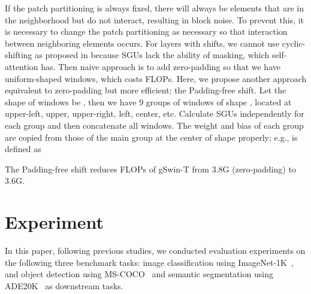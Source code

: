 \documentclass{article}
\begin{document}
If the patch partitioning is always fixed, there will always be elements that are in the neighborhood but do not interact, resulting in block noise. To prevent this, it is necessary to change the patch partitioning as necessary so that interaction between neighboring elements occurs.
For layers with shifts, we cannot use cyclic-shifting as proposed in \citep{liu2021swin} because SGUs lack the ability of masking, which self-attention has. Then naive approach is to add zero-padding so that we have uniform-shaped windows, which costs FLOPs. Here, we propose another approach equivalent to zero-padding but more efficient; the Padding-free shift.
Let the shape of windows be , then we have 9 groups of windows of shape , located at upper-left, upper, upper-right, left, center, etc. Calculate SGUs independently for each group and then concatenate all windows. The weight and bias of each group are copied from those of the main group at the center of shape  properly; e.g.,  is defined as

The Padding-free shift reduces FLOPs of gSwin-T from 3.8G (zero-padding) to 3.6G.

\section{Experiment}\label{label:012}

In this paper, following previous studies, we conducted evaluation experiments on the following three benchmark tasks: 
image classification using ImageNet-1K~\citep{deng2009imagenet}, and object detection
using MS-COCO~\cite{lin2014microsoft}
and semantic segmentation using ADE20K~\citep{zhou2019semantic} as downstream tasks.
\end{document}
